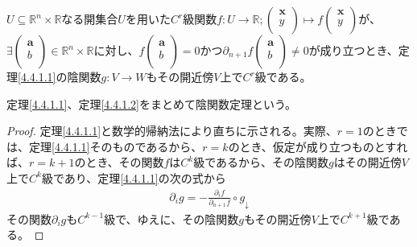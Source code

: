 \documentclass[dvipdfmx]{jsarticle}
\begin{document}
\begin{thm}[陰関数定理]\label{4.4.1.2}
$U \subseteq \mathbb{R}^{n} \times \mathbb{R}$なる開集合$U$を用いた$C^{r}$級関数$f:U \rightarrow \mathbb{R};\begin{pmatrix}
\mathbf{x} \\
y \\
\end{pmatrix} \mapsto f\begin{pmatrix}
\mathbf{x} \\
y \\
\end{pmatrix}$が、$\exists\begin{pmatrix}
\mathbf{a} \\
b \\
\end{pmatrix} \in \mathbb{R}^{n} \times \mathbb{R}$に対し、$f\begin{pmatrix}
\mathbf{a} \\
b \\
\end{pmatrix} = 0$かつ$\partial_{n + 1}f\begin{pmatrix}
\mathbf{a} \\
b \\
\end{pmatrix} \neq 0$が成り立つとき、定理\ref{4.4.1.1}の陰関数$g:V \rightarrow W$もその開近傍$V$上で$C^{r}$級である。\par
定理\ref{4.4.1.1}、定理\ref{4.4.1.2}をまとめて陰関数定理という。
\end{thm}
\begin{proof} 定理\ref{4.4.1.1}と数学的帰納法により直ちに示される。実際、$r = 1$のときでは、定理\ref{4.4.1.1}そのものであるから、$r = k$のとき、仮定が成り立つものとすれば、$r = k + 1$のとき、その関数$f$は$C^{k}$級であるから、その陰関数$g$はその開近傍$V$上で$C^{k}$級であり、定理\ref{4.4.1.1}の次の式から
\begin{align*}
\partial_{i}g = - \frac{\partial_{i}f}{\partial_{n + 1}f} \circ g_{\downarrow}
\end{align*}
その関数$\partial_{i}g$も$C^{k - 1}$級で、ゆえに、その陰関数$g$もその開近傍$V$上で$C^{k + 1}$級である。
\end{proof}
\end{document}
